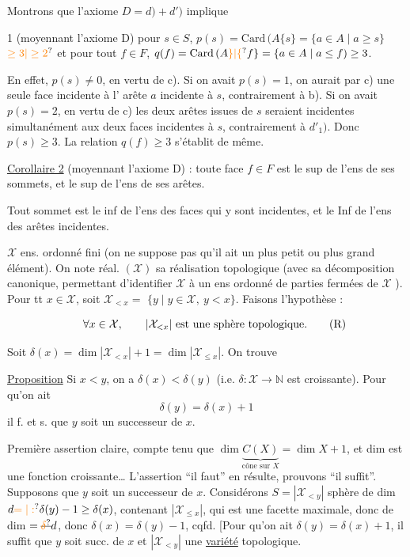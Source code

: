 Montrons que l'axiome $D=d)+d')$ implique

 1 (moyennant l'axiome D) pour  $s\in S$,
 $p(s)=\mathrm{Card}\,(A\{s\}=\{a\in A\mid a\geq s\}$  $\unsure{\geq3|\geq2}$ et pour
tout $f\in F$, $q(f)=\mathrm{Card}\,(A\unsure{\}|\{}f\}=\{a\in A\mid a\leq f)\geq3$.

En effet,  $p(s)\ne0$, en vertu de
c). Si on avait $p(s)=1$, on aurait par c) une
seule face incidente à l' arête $a$ incidente à $s$,
contrairement à b). Si on avait $p(s)=2$, en vertu
de c) les deux arêtes issues de $s$ seraient incidentes
simultanément aux deux faces incidentes à $s$,
contrairement à $d'_1)$. Donc $p(s)\geq3$. La relation
$q(f)\geq3$ s'établit de même.

\uline{Corollaire 2} (moyennant l'axiome D) : toute face
$f\in F$ est le sup de l'ens de ses sommets,
et le sup de l'ens de ses arêtes.

Tout sommet est le inf de l'ens des
faces qui y sont incidentes, et le
Inf de l'ens des arêtes incidentes.

 $\mathcal X$ ens. ordonné fini (on ne suppose pas qu'il
ait un plus petit ou plus grand élément). On
note  réal. $(\mathcal X)$ sa réalisation topologique (avec sa
décomposition  canonique, permettant
d'identifier $\mathcal X$ à un ens ordonné de parties
fermées de $\mathcal X$ ). Pour tt $x\in\mathcal X$, soit
$\mathcal X_{<x}=$  $\{y\mid y\in\mathcal X,\ y<x\}$. Faisons l'hypothèse :

\[
\forall x\in\mathcal X,\qquad |\mathcal X_{<x}|\ \text{est une sphère topologique.}\tag*{\llap{\makebox[\displaywidth][l]{(R)}}}
\]

Soit $\delta(x)=\dim|\mathcal X_{<x}|+1=\dim|\mathcal X_{\leq x}|$. On trouve

\uline{Proposition} Si $x<y$, on a $\delta(x)<\delta(y)$ (i.e. $\delta:\mathcal X\to\mathbb N$
est  croissante). Pour qu'on ait 
\[
\delta(y)=\delta(x)+1
\]
il f. et s. que $y$ soit un successeur de $x$.

Première assertion claire,  compte tenu
que $\dim\underbrace{C(X)}_{\text{cône sur }X}=\dim X+1$, et dim est
une fonction croissante\ldots{} L'assertion ``il faut''
en résulte, prouvons ``il suffit''. Supposons que
$y$ soit un successeur de $x$. Considérons
$S=|\mathcal X_{<y}|$ sphère de dim $d\unsure{=|:}\delta(y)-1\geq\delta(x)$,
contenant $|\mathcal X_{\leq x}|$, qui est une facette
maximale, donc de dim $=\deleted{\unsure{\delta}}d$, donc $\delta(x)=\delta(y)-1$,
cqfd. [Pour qu'on ait $\delta(y)=\delta(x)+1$, il suffit que
$y$ soit succ. de $x$ et $|\mathcal X_{<y}|$ une \uline{variété} topologique.

